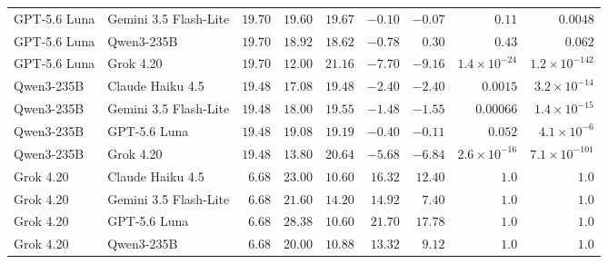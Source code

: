 \begin{table}[!htbp]
\begin{tabular}{@{}llrrrrrrr@{}}
GPT-5.6 Luna & Gemini 3.5 Flash-Lite & $19.70$ & $19.60$ & $19.67$ & $-0.10$ & $-0.07$ & $0.11$ & $0.0048$ \\
GPT-5.6 Luna & Qwen3-235B & $19.70$ & $18.92$ & $18.62$ & $-0.78$ & $0.30$ & $0.43$ & $0.062$ \\
GPT-5.6 Luna & Grok 4.20 & $19.70$ & $12.00$ & $21.16$ & $-7.70$ & $-9.16$ & $1.4\times10^{-24}$ & $1.2\times10^{-142}$ \\
\addlinespace[2pt]
Qwen3-235B & Claude Haiku 4.5 & $19.48$ & $17.08$ & $19.48$ & $-2.40$ & $-2.40$ & $0.0015$ & $3.2\times10^{-14}$ \\
Qwen3-235B & Gemini 3.5 Flash-Lite & $19.48$ & $18.00$ & $19.55$ & $-1.48$ & $-1.55$ & $0.00066$ & $1.4\times10^{-15}$ \\
Qwen3-235B & GPT-5.6 Luna & $19.48$ & $19.08$ & $19.19$ & $-0.40$ & $-0.11$ & $0.052$ & $4.1\times10^{-6}$ \\
Qwen3-235B & Grok 4.20 & $19.48$ & $13.80$ & $20.64$ & $-5.68$ & $-6.84$ & $2.6\times10^{-16}$ & $7.1\times10^{-101}$ \\
\addlinespace[2pt]
Grok 4.20 & Claude Haiku 4.5 & $6.68$ & $23.00$ & $10.60$ & $16.32$ & $12.40$ & $1.0$ & $1.0$ \\
Grok 4.20 & Gemini 3.5 Flash-Lite & $6.68$ & $21.60$ & $14.20$ & $14.92$ & $7.40$ & $1.0$ & $1.0$ \\
Grok 4.20 & GPT-5.6 Luna & $6.68$ & $28.38$ & $10.60$ & $21.70$ & $17.78$ & $1.0$ & $1.0$ \\
Grok 4.20 & Qwen3-235B & $6.68$ & $20.00$ & $10.88$ & $13.32$ & $9.12$ & $1.0$ & $1.0$ \\
\bottomrule
\end{tabular}
\end{table}

